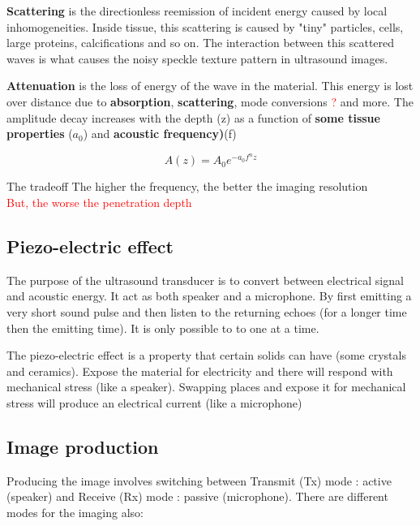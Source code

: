 	\textbf{Scattering} is the directionless reemission of incident energy caused by local inhomogeneities. Inside tissue, this scattering is caused by "tiny" particles, cells, large proteins, calcifications and so on. The interaction between this scattered waves is what causes the noisy speckle texture pattern in ultrasound images. 

	\textbf{Attenuation} is the loss of energy of the wave in the material. This energy is lost over distance due to \textbf{absorption}, \textbf{scattering}, mode conversions \textcolor{red}{?} and more. The amplitude decay increases with the depth (z) as a function of \textbf{some tissue properties} ($a_0$) and \textbf{acoustic frequency)}(f) 


		\begin{equation}
		A(z) = A_0 e^{-a_0 f^{n}z}
		\end{equation}

		\begin{wbox}{The tradeoff}
			\textcolor{OliveGreen}{The higher the frequency, the better the imaging resolution } \\
			\textcolor{red}{But, the worse the penetration depth} 
		\end{wbox}
	
	\subsection{Piezo-electric effect}
	The purpose of the ultrasound transducer is to convert between electrical signal and acoustic energy. It act as both speaker and a microphone. By first emitting a very short sound pulse and then listen to the returning echoes (for a longer time then the emitting time). It is only possible to to one at a time. 

	The piezo-electric effect is a property that certain solids can have (some crystals and ceramics). Expose the material for electricity and there will respond with mechanical stress (like a speaker). Swapping places and expose it for mechanical stress will produce an electrical current (like a microphone)

	\subsection{Image production}
	Producing the image involves switching between Transmit (Tx) mode : active (speaker) and Receive (Rx) mode : passive (microphone). There are different modes for the imaging also:

